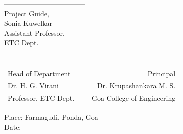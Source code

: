 \noindent -----------------------------------\\
Project Guide,\\
Sonia Kuwelkar\\
Assistant Professor,\\
ETC Dept.\\



\begin{table}[H]
\begin{tabular}{lr}
\noindent --------------------------------- & \hspace{4cm} ----------------------------------- \\
Head of Department & Principal\\
Dr. H. G. Virani & Dr. Krupashankara M. S.\\
Professor, ETC Dept. & Goa College of Engineering\\
\end{tabular}
\end{table}
\vspace{-0.5cm}
\noindent Place: Farmagudi, Ponda, Goa\\
\noindent Date: